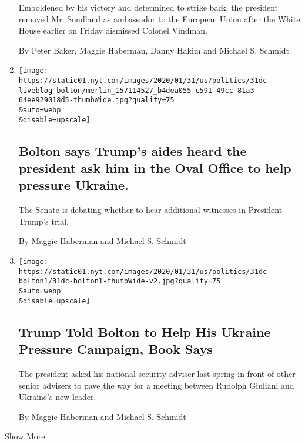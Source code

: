 \begin{enumerate}
  Emboldened by his victory and determined to strike back, the president
  removed Mr. Sondland as ambassador to the European Union after the
  White House earlier on Friday dismissed Colonel Vindman.

  By Peter Baker, Maggie Haberman, Danny Hakim and Michael S. Schmidt
\item
  \href{/live/2020/trump-impeachment-trial-01-31/bolton-oval-office-ukraine}{}

  \texttt{[image: https://static01.nyt.com/images/2020/01/31/us/politics/31dc-liveblog-bolton/merlin\_157114527\_b4dea055-c591-49cc-81a3-64ee929018d5-thumbWide.jpg?quality=75\\\&auto=webp\\\&disable=upscale]}

  \hypertarget{bolton-says-trumps-aides-heard-the-president-ask-him-in-the-oval-office-to-help-pressure-ukraine}{%
  \subsection{Bolton says Trump's aides heard the president ask him in
  the Oval Office to help pressure
  Ukraine.}\label{bolton-says-trumps-aides-heard-the-president-ask-him-in-the-oval-office-to-help-pressure-ukraine}}

  The Senate is debating whether to hear additional witnesses in
  President Trump's trial.

  By Maggie Haberman and Michael S. Schmidt
\item
  \href{/2020/01/31/us/politics/trump-bolton-ukraine.html}{}

  \texttt{[image: https://static01.nyt.com/images/2020/01/31/us/politics/31dc-bolton1/31dc-bolton1-thumbWide-v2.jpg?quality=75\\\&auto=webp\\\&disable=upscale]}

  \hypertarget{trump-told-bolton-to-help-his-ukraine-pressure-campaign-book-says}{%
  \subsection{Trump Told Bolton to Help His Ukraine Pressure Campaign,
  Book
  Says}\label{trump-told-bolton-to-help-his-ukraine-pressure-campaign-book-says}}

  The president asked his national security adviser last spring in front
  of other senior advisers to pave the way for a meeting between Rudolph
  Giuliani and Ukraine's new leader.

  By Maggie Haberman and Michael S. Schmidt
\end{enumerate}

Show More

